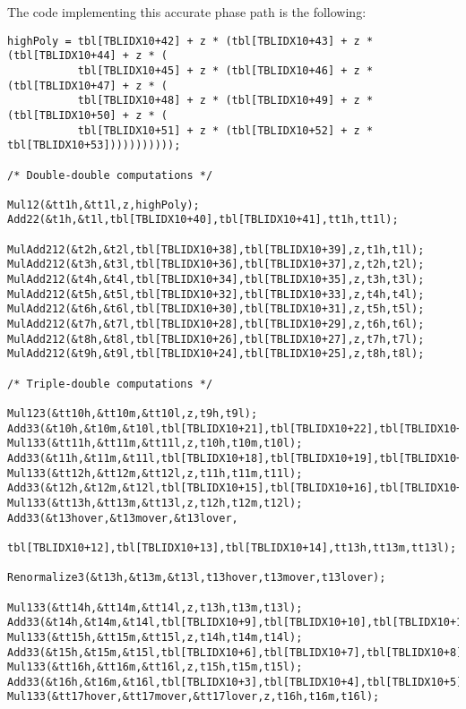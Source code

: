 The code implementing this accurate phase path is the following:
\begin{lstlisting}[caption={High path accurate phase polynomial approximation},firstnumber=1]
highPoly = tbl[TBLIDX10+42] + z * (tbl[TBLIDX10+43] + z * (tbl[TBLIDX10+44] + z * (
           tbl[TBLIDX10+45] + z * (tbl[TBLIDX10+46] + z * (tbl[TBLIDX10+47] + z * (
           tbl[TBLIDX10+48] + z * (tbl[TBLIDX10+49] + z * (tbl[TBLIDX10+50] + z * (
           tbl[TBLIDX10+51] + z * (tbl[TBLIDX10+52] + z *  tbl[TBLIDX10+53]))))))))));

/* Double-double computations */

Mul12(&tt1h,&tt1l,z,highPoly);
Add22(&t1h,&t1l,tbl[TBLIDX10+40],tbl[TBLIDX10+41],tt1h,tt1l);

MulAdd212(&t2h,&t2l,tbl[TBLIDX10+38],tbl[TBLIDX10+39],z,t1h,t1l);
MulAdd212(&t3h,&t3l,tbl[TBLIDX10+36],tbl[TBLIDX10+37],z,t2h,t2l);
MulAdd212(&t4h,&t4l,tbl[TBLIDX10+34],tbl[TBLIDX10+35],z,t3h,t3l);
MulAdd212(&t5h,&t5l,tbl[TBLIDX10+32],tbl[TBLIDX10+33],z,t4h,t4l);
MulAdd212(&t6h,&t6l,tbl[TBLIDX10+30],tbl[TBLIDX10+31],z,t5h,t5l);
MulAdd212(&t7h,&t7l,tbl[TBLIDX10+28],tbl[TBLIDX10+29],z,t6h,t6l);
MulAdd212(&t8h,&t8l,tbl[TBLIDX10+26],tbl[TBLIDX10+27],z,t7h,t7l);
MulAdd212(&t9h,&t9l,tbl[TBLIDX10+24],tbl[TBLIDX10+25],z,t8h,t8l);

/* Triple-double computations */

Mul123(&tt10h,&tt10m,&tt10l,z,t9h,t9l);
Add33(&t10h,&t10m,&t10l,tbl[TBLIDX10+21],tbl[TBLIDX10+22],tbl[TBLIDX10+23],tt10h,tt10m,tt10l);
Mul133(&tt11h,&tt11m,&tt11l,z,t10h,t10m,t10l);
Add33(&t11h,&t11m,&t11l,tbl[TBLIDX10+18],tbl[TBLIDX10+19],tbl[TBLIDX10+20],tt11h,tt11m,tt11l);
Mul133(&tt12h,&tt12m,&tt12l,z,t11h,t11m,t11l);
Add33(&t12h,&t12m,&t12l,tbl[TBLIDX10+15],tbl[TBLIDX10+16],tbl[TBLIDX10+17],tt12h,tt12m,tt12l);
Mul133(&tt13h,&tt13m,&tt13l,z,t12h,t12m,t12l);
Add33(&t13hover,&t13mover,&t13lover,
                        tbl[TBLIDX10+12],tbl[TBLIDX10+13],tbl[TBLIDX10+14],tt13h,tt13m,tt13l);

Renormalize3(&t13h,&t13m,&t13l,t13hover,t13mover,t13lover);

Mul133(&tt14h,&tt14m,&tt14l,z,t13h,t13m,t13l);
Add33(&t14h,&t14m,&t14l,tbl[TBLIDX10+9],tbl[TBLIDX10+10],tbl[TBLIDX10+11],tt14h,tt14m,tt14l);
Mul133(&tt15h,&tt15m,&tt15l,z,t14h,t14m,t14l);
Add33(&t15h,&t15m,&t15l,tbl[TBLIDX10+6],tbl[TBLIDX10+7],tbl[TBLIDX10+8],tt15h,tt15m,tt15l);
Mul133(&tt16h,&tt16m,&tt16l,z,t15h,t15m,t15l);
Add33(&t16h,&t16m,&t16l,tbl[TBLIDX10+3],tbl[TBLIDX10+4],tbl[TBLIDX10+5],tt16h,tt16m,tt16l);
Mul133(&tt17hover,&tt17mover,&tt17lover,z,t16h,t16m,t16l);


\end{lstlisting}
